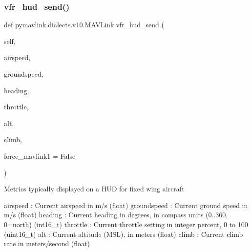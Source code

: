 \begin{DoxyVerb}
\begin{DoxyVerb}
\begin{DoxyVerb}
\begin{DoxyVerb}
\begin{DoxyVerb}
\begin{DoxyVerb}
\begin{DoxyVerb}
\begin{DoxyVerb}
\begin{DoxyVerb}
\begin{DoxyVerb}
\subsubsection{\texorpdfstring{vfr\+\_\+hud\+\_\+send()}{vfr\_hud\_send()}}
{\footnotesize\ttfamily def pymavlink.\+dialects.\+v10.\+M\+A\+V\+Link.\+vfr\+\_\+hud\+\_\+send (\begin{DoxyParamCaption}\item[{}]{self,  }\item[{}]{airspeed,  }\item[{}]{groundspeed,  }\item[{}]{heading,  }\item[{}]{throttle,  }\item[{}]{alt,  }\item[{}]{climb,  }\item[{}]{force\+\_\+mavlink1 = {\ttfamily False} }\end{DoxyParamCaption})}

\begin{DoxyVerb}Metrics typically displayed on a HUD for fixed wing aircraft

airspeed                  : Current airspeed in m/s (float)
groundspeed               : Current ground speed in m/s (float)
heading                   : Current heading in degrees, in compass units (0..360, 0=north) (int16_t)
throttle                  : Current throttle setting in integer percent, 0 to 100 (uint16_t)
alt                       : Current altitude (MSL), in meters (float)
climb                     : Current climb rate in meters/second (float)\end{DoxyVerb}
 \mbox{\label{classpymavlink_1_1dialects_1_1v10_1_1MAVLink_ae9d5716d53ff7e3316cb9b60859b6401}} 

\end{DoxyVerb}
\end{DoxyVerb}
\end{DoxyVerb}
\end{DoxyVerb}
\end{DoxyVerb}
\end{DoxyVerb}
\end{DoxyVerb}
\end{DoxyVerb}
\end{DoxyVerb}
\end{DoxyVerb}
